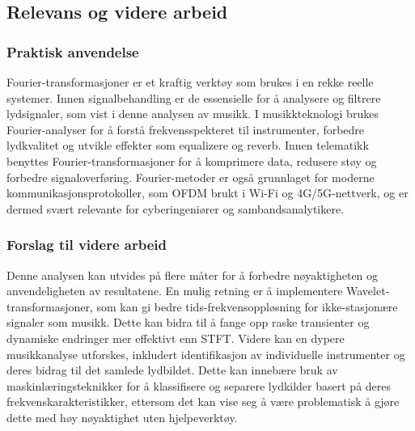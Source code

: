 \subsection{Relevans og videre arbeid}

\subsubsection{Praktisk anvendelse}
Fourier-transformasjoner er et kraftig verktøy som brukes i en rekke reelle systemer. Innen signalbehandling er de essensielle for å analysere og filtrere lydsignaler, som vist i denne analysen av musikk. I musikkteknologi brukes Fourier-analyser for å forstå frekvensspekteret til instrumenter, forbedre lydkvalitet og utvikle effekter som equalizere og reverb. Innen telematikk benyttes Fourier-transformasjoner for å komprimere data, redusere støy og forbedre signaloverføring. Fourier-metoder er også grunnlaget for moderne kommunikasjonsprotokoller, som OFDM brukt i Wi-Fi og 4G/5G-nettverk, og er dermed svært relevante for cyberingeniører og sambandsanalytikere. 

\subsubsection{Forslag til videre arbeid}
Denne analysen kan utvides på flere måter for å forbedre nøyaktigheten og anvendeligheten av resultatene. En mulig retning er å implementere Wavelet-transformasjoner, som kan gi bedre tids-frekvensoppløsning for ikke-stasjonære signaler som musikk. Dette kan bidra til å fange opp raske transienter og dynamiske endringer mer effektivt enn STFT. Videre kan en dypere musikkanalyse utforskes, inkludert identifikasjon av individuelle instrumenter og deres bidrag til det samlede lydbildet. Dette kan innebære bruk av maskinlæringsteknikker for å klassifisere og separere lydkilder basert på deres frekvenskarakteristikker, ettersom det kan vise seg å være problematisk å gjøre dette med høy nøyaktighet uten hjelpeverktøy. 


